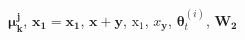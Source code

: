 $\bm{\mu_k^{j}}$, $\mathbf{x_{1}} = \mathbf{x_1}$, $\mathbf{x+y}$, $\mathrm{x_1}$, $x_\mathbf{y}$, $\bm{\theta}^{(i)}_{t}$, $\mathbf{W_{2}}$
